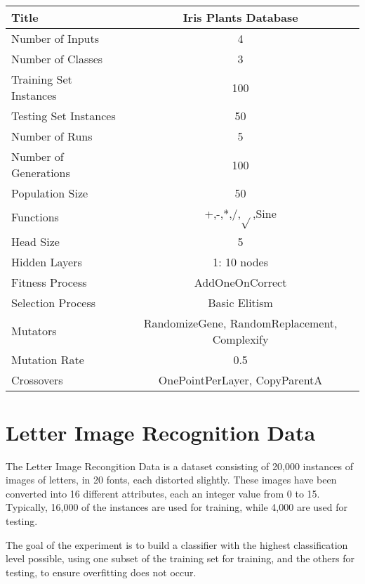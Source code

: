 \documentclass[a4paper,11pt]{report}
\begin{document}
\begin{tabular}{| l | c |}
 \hline
 Title & Iris Plants Database \\
 \hline
 Number of Inputs & 4 \\
 Number of Classes & 3 \\
 Training Set Instances & 100 \\
 Testing Set Instances & 50 \\
 Number of Runs & 5 \\
 Number of Generations & 100 \\
 Population Size & 50 \\
 Functions & +,-,*,/,$\sqrt{}$,Sine \\
 Head Size & 5 \\
 Hidden Layers & 1: 10 nodes \\
 Fitness Process & AddOneOnCorrect \\
 Selection Process & Basic Elitism \\
 Mutators & RandomizeGene, RandomReplacement, Complexify \\
 Mutation Rate & 0.5 \\
 Crossovers & OnePointPerLayer, CopyParentA \\ 
 \hline
\end{tabular}


\section{Letter Image Recognition Data}
 The Letter Image Recongition Data is a dataset consisting of 20,000 instances of images of letters, in 
20 fonts, each distorted slightly. These images have been converted into 16 different attributes, each an 
integer value from 0 to 15. Typically, 16,000 of the instances are used for training, while 4,000 are used for
testing.

The goal of the experiment is to build a classifier with the highest classification level possible, 
using one subset of the training set for training, and the others for testing, to ensure overfitting 
does not occur. 
\end{document}
